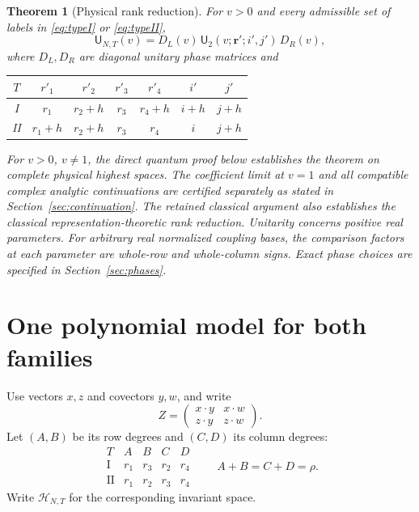 \documentclass[10pt,a4paper]{article}
\newtheorem{theorem}{Theorem}
\newenvironment{revision}{\begingroup}{\endgroup}
\begin{document}
\begin{theorem}[Physical rank reduction]\label{thm:physical}
For $v>0$ and every admissible set of labels in \eqref{eq:typeI} or
\eqref{eq:typeII},
\begin{equation}\label{eq:physical}
 \mathsf U_{N,T}(v)=D_L(v)\,
 \mathsf U_{2}(v;\boldsymbol r';i',j')\,D_R(v),
\end{equation}
where $D_L,D_R$ are diagonal unitary phase matrices and
\begin{center}
\begin{tabular}{c@{\qquad}cccccc}
\toprule
$T$ & $r'_1$ & $r'_2$ & $r'_3$ & $r'_4$ & $i'$ & $j'$\\
\midrule
I & $r_1$ & $r_2+h$ & $r_3$ & $r_4+h$ & $i+h$ & $j+h$\\
II & $r_1+h$ & $r_2+h$ & $r_3$ & $r_4$ & $i$ & $j+h$\\
\bottomrule
\end{tabular}
\end{center}
\begin{revision}
For $v>0$, $v\ne1$, the direct quantum proof below establishes the theorem
on complete physical highest spaces. The coefficient limit at $v=1$ and
all compatible complex analytic continuations are certified separately
as stated in Section~\ref{sec:continuation}. The retained classical argument
also establishes the classical representation-theoretic rank reduction.
Unitarity concerns positive real parameters. For arbitrary real normalized
coupling bases, the comparison factors at each parameter are whole-row
and whole-column signs. Exact phase choices are specified in
Section~\ref{sec:phases}.
\end{revision}
\end{theorem}

\section{One polynomial model for both families}
Use vectors $x,z$ and covectors $y,w$, and write
\[
 Z=\begin{pmatrix}x\cdot y&x\cdot w\\z\cdot y&z\cdot w\end{pmatrix}.
\]
Let $(A,B)$ be its row degrees and $(C,D)$ its column degrees:
\[
\begin{array}{c|cccc}
T&A&B&C&D\\\hline
\mathrm I&r_1&r_3&r_2&r_4\\
\mathrm {II}&r_1&r_2&r_3&r_4
\end{array}
\qquad A+B=C+D=\rho.
\]
Write $\mathcal H_{N,T}$ for the corresponding invariant space.
\end{document}
